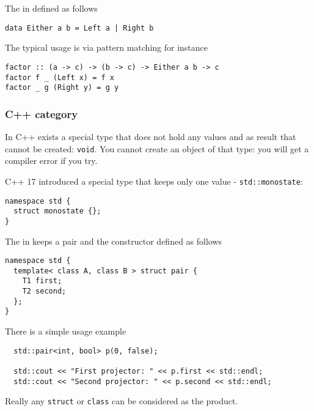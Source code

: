 \begin{example}
\label{ex:hask_sum}
The  in  defined as
follows 
\begin{verbatim}
data Either a b = Left a | Right b
\end{verbatim}

The typical usage is via pattern matching for instance 
\begin{verbatim}
factor :: (a -> c) -> (b -> c) -> Either a b -> c
factor f _ (Left x) = f x
factor _ g (Right y) = g y
\end{verbatim}
\end{example}


\subsubsection{\textbf{C++} category}
\begin{example}
\label{ex:cpp_initial_object}
In C++ exists a special type that does not hold any values and as
result that cannot be created: \texttt{void}.
You cannot create an object of that type: you will get a compiler
error if you try.
\end{example}

\begin{example}
\label{ex:cpp_terminal_object}
C++ 17 introduced a special type that keeps only one value -
\texttt{std::monostate}:  
\begin{verbatim}
namespace std {
  struct monostate {};
}
\end{verbatim}
\end{example}

\begin{example}[Product][\textbf{C++}]
\label{ex:cpp_product}
The  in  keeps a
pair and the constructor defined as follows
\begin{verbatim}
namespace std {
  template< class A, class B > struct pair {
    T1 first;
    T2 second;
  };
}
\end{verbatim}

There is a simple usage example
\begin{verbatim}
  std::pair<int, bool> p(0, false);

  std::cout << "First projector: " << p.first << std::endl;
  std::cout << "Second projector: " << p.second << std::endl;

\end{verbatim}
Really any \texttt{struct} or \texttt{class} can be
considered as the product. 
\end{example}

